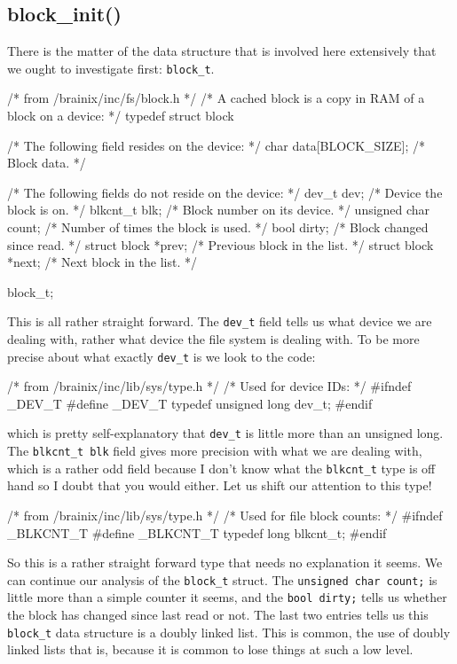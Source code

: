 \subsection{block\_init()}
There is the matter of the data structure that is involved here extensively that we ought to investigate first: \verb|block_t|.
\begin{code}[numbers=left,firstnumber=43]
/* from /brainix/inc/fs/block.h */
/* A cached block is a copy in RAM of a block on a device: */
typedef struct block
{
	/* The following field resides on the device: */
	char data[BLOCK_SIZE]; /* Block data. */

	/* The following fields do not reside on the device: */
	dev_t dev;             /* Device the block is on.            */
	blkcnt_t blk;          /* Block number on its device.        */
	unsigned char count;   /* Number of times the block is used. */
	bool dirty;            /* Block changed since read.          */
	struct block *prev;    /* Previous block in the list.        */
	struct block *next;    /* Next block in the list.            */
} block_t;
\end{code}
This is all rather straight forward. The \verb|dev_t| field tells us what device we are dealing with, rather what device the file system is dealing with. To be more precise about what exactly \verb|dev_t| is we look to the code:
\begin{code}[numbers=left,firstnumber=48]
/* from /brainix/inc/lib/sys/type.h */
/* Used for device IDs: */
#ifndef _DEV_T
#define _DEV_T
typedef unsigned long dev_t;
#endif
\end{code}
which is pretty self-explanatory that \verb|dev_t| is little more than an unsigned long. The \verb|blkcnt_t blk| field gives more precision with what we are dealing with, which is a rather odd field because I don't know what the \verb|blkcnt_t| type is off hand so I doubt that you would either. Let us shift our attention to this type!
\begin{code}[numbers=left,firstnumber=30]
/* from /brainix/inc/lib/sys/type.h */
/* Used for file block counts: */
#ifndef _BLKCNT_T
#define _BLKCNT_T
typedef long blkcnt_t;
#endif
\end{code}
So this is a rather straight forward type that needs no explanation it seems. We can continue our analysis of the \verb|block_t| struct. The \verb|unsigned char count;| is little more than a simple counter it seems, and the \verb|bool dirty;| tells us whether the block has changed since last read or not. The last two entries tells us this \verb|block_t| data structure is a doubly linked list. This is common, the use of doubly linked lists that is, because it is common to lose things at such a low level.

